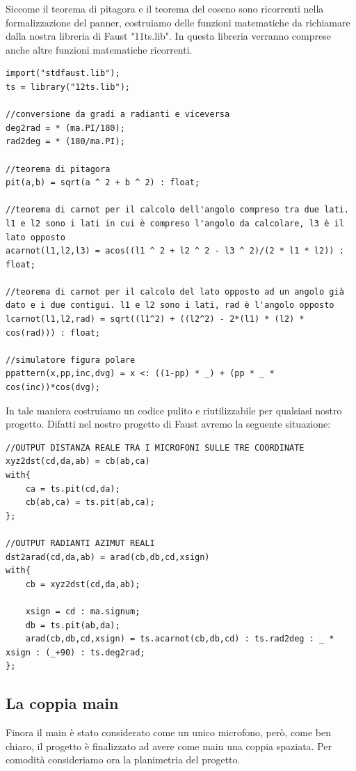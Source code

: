 \documentclass{article}
\begin{document}
    Siccome il teorema di pitagora e il teorema del coseno sono ricorrenti nella formalizzazione del panner, costruiamo delle funzioni matematiche da richiamare dalla nostra libreria di Faust "11ts.lib". In questa libreria verranno comprese anche altre funzioni matematiche ricorrenti.
    
    \begin{lstlisting}
import("stdfaust.lib");
ts = library("12ts.lib");

//conversione da gradi a radianti e viceversa
deg2rad = * (ma.PI/180);
rad2deg = * (180/ma.PI);

//teorema di pitagora
pit(a,b) = sqrt(a ^ 2 + b ^ 2) : float;

//teorema di carnot per il calcolo dell'angolo compreso tra due lati. l1 e l2 sono i lati in cui è compreso l'angolo da calcolare, l3 è il lato opposto
acarnot(l1,l2,l3) = acos((l1 ^ 2 + l2 ^ 2 - l3 ^ 2)/(2 * l1 * l2)) : float;

//teorema di carnot per il calcolo del lato opposto ad un angolo già dato e i due contigui. l1 e l2 sono i lati, rad è l'angolo opposto
lcarnot(l1,l2,rad) = sqrt((l1^2) + ((l2^2) - 2*(l1) * (l2) * cos(rad))) : float;

//simulatore figura polare
ppattern(x,pp,inc,dvg) = x <: ((1-pp) * _) + (pp * _ * cos(inc))*cos(dvg);
    \end{lstlisting}
    
    
    In tale maniera costruiamo un codice pulito e riutilizzabile per qualsiasi nostro progetto.
    Difatti nel nostro progetto di Faust avremo la seguente situazione:
    
    \begin{lstlisting}
//OUTPUT DISTANZA REALE TRA I MICROFONI SULLE TRE COORDINATE
xyz2dst(cd,da,ab) = cb(ab,ca)
with{
    ca = ts.pit(cd,da);
    cb(ab,ca) = ts.pit(ab,ca);
};

//OUTPUT RADIANTI AZIMUT REALI
dst2arad(cd,da,ab) = arad(cb,db,cd,xsign)
with{
    cb = xyz2dst(cd,da,ab);

    xsign = cd : ma.signum;
    db = ts.pit(ab,da);
    arad(cb,db,cd,xsign) = ts.acarnot(cb,db,cd) : ts.rad2deg : _ * xsign : (_+90) : ts.deg2rad;
};
    \end{lstlisting}

    \subsection{La coppia main}
    
    Finora il main è stato considerato come un unico microfono, però, come ben chiaro, il progetto è finalizzato ad avere come main una coppia spaziata. Per comodità consideriamo ora la planimetria del progetto.
\end{document}
